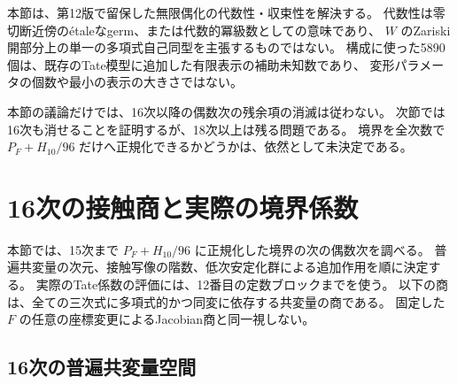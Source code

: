 \begin{remark}[改善された範囲と残る問題]
本節は、第12版で留保した無限偶化の代数性・収束性を解決する。
代数性は零切断近傍の\'etaleなgerm、または代数的冪級数としての意味であり、
$W$ のZariski開部分上の単一の多項式自己同型を主張するものではない。
構成に使った5890個は、既存のTate模型に追加した有限表示の補助未知数であり、
変形パラメータの個数や最小の表示の大きさではない。

本節の議論だけでは、16次以降の偶数次の残余項の消滅は従わない。
次節では16次も消せることを証明するが、18次以上は残る問題である。
境界を全次数で $P_F+H_{10}/96$ だけへ正規化できるかどうかは、依然として未決定である。
\end{remark}


\clearpage
\section{16次の接触商と実際の境界係数}
\label{sec:contact-sixteen}

本節では、15次まで $P_F+H_{10}/96$ に正規化した境界の次の偶数次を調べる。
普遍共変量の次元、接触写像の階数、低次安定化群による追加作用を順に決定する。
実際のTate係数の評価には、12番目の定数ブロックまでを使う。
以下の商は、全ての三次式に多項式的かつ同変に依存する共変量の商である。
固定した $F$ の任意の座標変更によるJacobian商と同一視しない。


\subsection{16次の普遍共変量空間}
\label{subsec:v13-sixteenth-characters}

